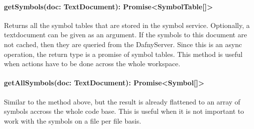 \paragraph{getSymbols(doc: TextDocument): Promise<SymbolTable[]>} Returns all the symbol tables that are stored in the symbol service. Optionally, a textdocument can be given as an argument. If the symbols to this document are not cached, then they are queried from the DafnyServer. Since this is an async operation, the return type is a promise of symbol tables. This method is useful when actions have to be done across the whole workspace.

\paragraph{getAllSymbols(doc: TextDocument): Promise<Symbol[]>} Similar to the method above, but the result is already flattened to an array of symbols accross the whole code base. This is useful when it is not important to work with the symbols on a file per file basis.

